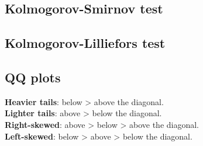 \subsection{Kolmogorov-Smirnov test}
\subsection{Kolmogorov-Lilliefors test}
\subsection{QQ plots}
\textbf{Heavier tails}: below > above the diagonal.\\
\textbf{Lighter tails}: above > below the diagonal.\\
\textbf{Right-skewed}: above > below > above the diagonal.\\
\textbf{Left-skewed}: below > above > below the diagonal.\\